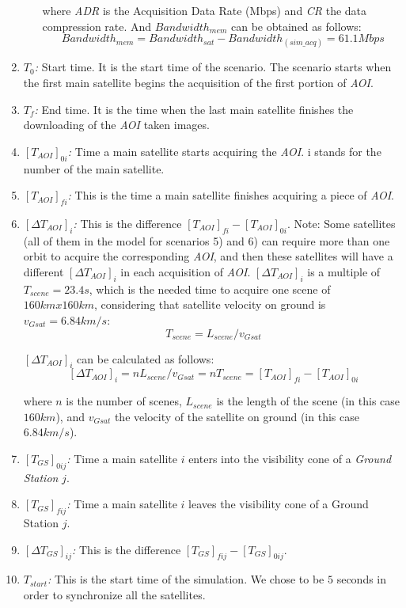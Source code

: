 \begin{enumerate}
\begin{itemize}
where \emph{ADR} is the Acquisition Data Rate (Mbps) and \emph{CR} the data
compression rate. And $Bandwidth_{mem}$ can be obtained as follows:
\begin{equation}\label{eq:bandwidth-mem}
  Bandwidth_{mem}=Bandwidth_{sat}-Bandwidth_{(sim\_acq)}=61.1Mbps
\end{equation}
\end{itemize}

\item \emph{$T_0$:} Start time. It is the start time of the scenario. The scenario starts when the first main satellite begins the acquisition of the first portion of \emph{AOI}.
\item \emph{$T_f$:} End time. It is the time when the last main satellite finishes the downloading of the \emph{AOI} taken images.
\item \emph{$[T_{AOI}]_{0i}$:} Time a main satellite starts acquiring the \emph{AOI}. i stands for the number of the main satellite. 
\item \emph{$[T_{AOI}]_{fi}$:} This is the time a main satellite finishes acquiring a piece of \emph{AOI}. 
\item \emph{$[\Delta T_{AOI}]_i$:} This is the difference
  $[T_{AOI}]_{fi}-[T_{AOI}]_{0i}$. Note: Some satellites (all of them in the
  model for scenarios 5) and 6) can require more than one orbit to acquire the
  corresponding \emph{AOI}, and then these satellites will have a different
  $[\Delta T_{AOI}]_i$ in each acquisition of \emph{AOI}. $[\Delta T_{AOI}]_i$
  is a multiple of  $T_{scene}=23.4 s$, which is the needed time to acquire one
  scene of $160km x 160km$, considering that satellite velocity on ground is
  $v_{Gsat}=6.84km/s$:
\begin{equation}\label{eq:Tscene}
	T_{scene}=L_{scene}/v_{Gsat}
\end{equation}

$[\Delta T_{AOI}]_i$  can be calculated as follows: 
\begin{equation}\label{eq:deltataoi}
[\Delta T_{AOI}]_i=n L_{scene}/v_{Gsat} =nT_{scene}=[T_{AOI}]_{fi}-[T_{AOI}]_{0i}
\end{equation}

where $n$ is the number of scenes, $L_{scene}$  is the length of the scene (in this case $160km$), and $v_{Gsat}$ the velocity of the satellite on ground (in this case $6.84km/s$).
\item \emph{$[T_{GS}]_{0ij}$:} Time a main satellite $i$ enters into the visibility cone of a \emph{Ground Station} $j$.
\item \emph{$[T_{GS}]_{fij}$:} Time a main satellite $i$ leaves the visibility cone of a Ground Station  $j$.
\item \emph{$[\Delta T_{GS}]_{ij}$:} This is the difference $[T_{GS}]_{fij}-[T_{GS}]_{0ij}.$
\item \emph{$T_{start}$:} This is the start time of the simulation. We chose to be $5$ seconds in order to synchronize all the satellites.
		
\end{enumerate}


